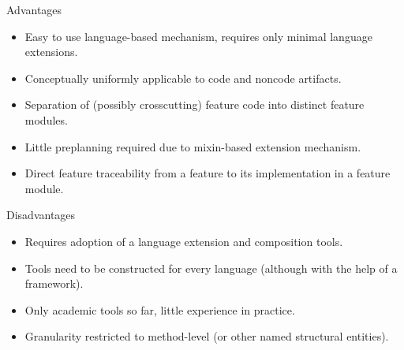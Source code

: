 \begin{frame}[label=DiscussionOfFeatureModules]{\myframetitle}
	\begin{fancycolumns}
		\begin{note}{Advantages}
			\begin{itemize}
				\item Easy to use language-based mechanism, requires only minimal language extensions.
				\item Conceptually uniformly applicable to code and noncode artifacts.
				\item Separation of (possibly crosscutting) feature code into distinct feature modules.
				\item Little preplanning required due to mixin-based extension mechanism.
				\item Direct feature traceability from a feature to its implementation in a feature module.
			\end{itemize}
		\end{note}
	\nextcolumn
		\begin{note}{Disadvantages}
			\begin{itemize}
				\item Requires adoption of a language extension and composition tools.
				\item Tools need to be constructed for every language (although with the help of a framework).
				\item Only academic tools so far, little experience in practice.
				\item Granularity restricted to method-level (or other named structural entities).
			\end{itemize}
		\end{note}
	\end{fancycolumns}
\end{frame}

